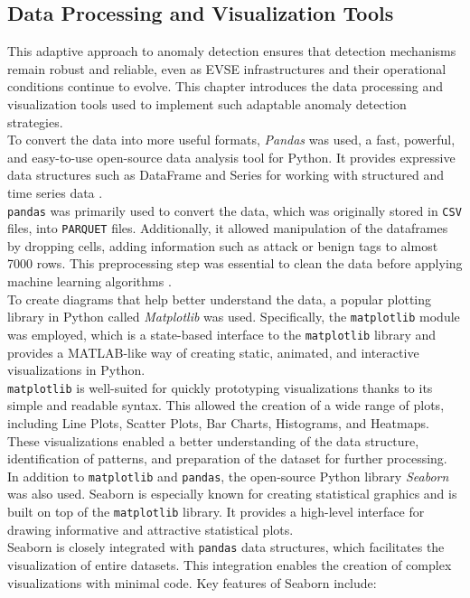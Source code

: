 \subsection{Data Processing and Visualization Tools}
\label{subsec:data_processing_and_visualization_tools}

This adaptive approach to anomaly detection ensures that detection mechanisms remain robust and reliable, even as EVSE infrastructures and their operational conditions continue to evolve. This chapter introduces the data processing and visualization tools used to implement such adaptable anomaly detection strategies.\\
To convert the data into more useful formats, \textit{Pandas} was used, a fast, powerful, and easy-to-use open-source data analysis tool for Python. It provides expressive data structures such as DataFrame and Series for working with structured and time series data \cite{pandas_wiki}.\\
\texttt{pandas} was primarily used to convert the data, which was originally stored in \texttt{CSV} files, into \texttt{PARQUET} files. Additionally, it allowed manipulation of the dataframes by dropping cells, adding information such as attack or benign tags to almost 7000 rows. This preprocessing step was essential to clean the data before applying machine learning algorithms \cite{pandas_wiki}.\\

To create diagrams that help better understand the data, a popular plotting library in Python called \textit{Matplotlib} was used. Specifically, the \texttt{matplotlib} module was employed, which is a state-based interface to the \texttt{matplotlib} library and provides a MATLAB-like way of creating static, animated, and interactive visualizations in Python.\\
\texttt{matplotlib} is well-suited for quickly prototyping visualizations thanks to its simple and readable syntax. This allowed the creation of a wide range of plots, including Line Plots, Scatter Plots, Bar Charts, Histograms, and Heatmaps.\\
These visualizations enabled a better understanding of the data structure, identification of patterns, and preparation of the dataset for further processing.\\

In addition to \texttt{matplotlib} and \texttt{pandas}, the open-source Python library \textit{Seaborn} was also used. Seaborn is especially known for creating statistical graphics and is built on top of the \texttt{matplotlib} library. It provides a high-level interface for drawing informative and attractive statistical plots.\\
Seaborn is closely integrated with \texttt{pandas} data structures, which facilitates the visualization of entire datasets. This integration enables the creation of complex visualizations with minimal code. Key features of Seaborn include:

